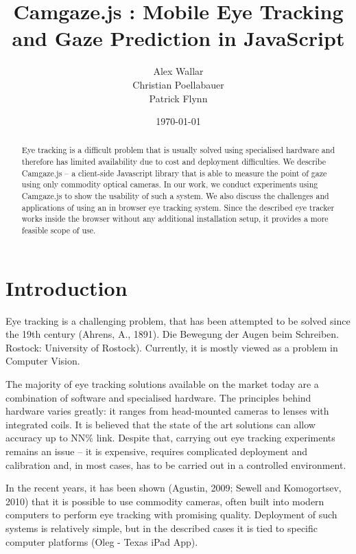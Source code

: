 \documentclass[annual]{acmsiggraph}
\title{Camgaze.js : Mobile Eye Tracking and Gaze Prediction in JavaScript}
\author{Alex Wallar \\ Christian Poellabauer \\ Patrick Flynn}
\date{\today}
\begin{document}
\maketitle

\begin{abstract}
Eye tracking is a difficult problem that is usually solved using specialised
hardware and therefore has limited availability due to cost and deployment
difficulties. We describe Camgaze.js – a client-side Javascript library that
is able to measure the point of gaze using only commodity optical cameras.
In our work, we conduct experiments using Camgaze.js to show the usability
of such a system. We also discuss the challenges and applications of using
an in browser eye tracking system. Since the described eye tracker works
inside the browser without any additional installation setup, it provides
a more feasible scope of use.
\end{abstract}

\section{Introduction}

Eye tracking is a challenging problem, that has been attempted to be solved since the 19th century (Ahrens, A., 1891). Die Bewegung der Augen beim Schreiben. Rostock: University of Rostock). Currently, it is mostly viewed as a problem in Computer Vision.

The majority of eye tracking solutions available on the market today are a combination of software and specialised hardware. The principles behind hardware varies greatly: it ranges from head-mounted cameras to lenses with integrated coils. It is believed that the state of the art solutions can allow accuracy up to NN\% {link}. Despite that, carrying out eye tracking experiments remains an issue – it is expensive, requires complicated deployment and calibration and, in most cases, has to be carried out in a controlled environment.

In the recent years, it has been shown (Agustin, 2009; Sewell and Komogortsev, 2010) that it is possible to use commodity cameras, often built into modern computers to perform eye tracking with promising quality. Deployment of such systems is relatively simple, but in the described cases it is tied to specific computer platforms (Oleg - Texas iPad App).
\end{document}
